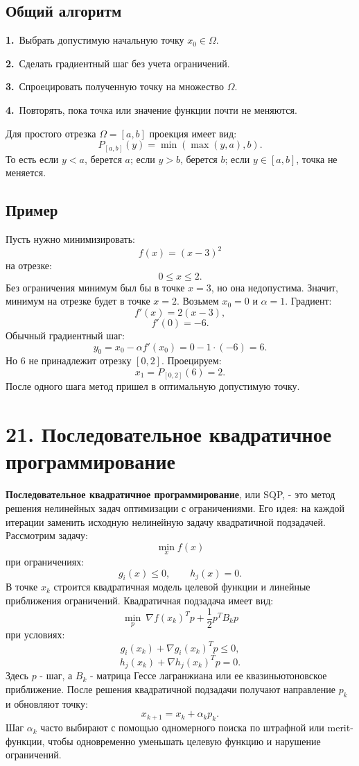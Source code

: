 \documentclass[12pt,a4paper]{article}
\begin{document}
\subsection{Общий алгоритм}
\noindent\textbf{1.}\ Выбрать допустимую начальную точку $x_0\in \Omega$.\par
\noindent\textbf{2.}\ Сделать градиентный шаг без учета ограничений.\par
\noindent\textbf{3.}\ Спроецировать полученную точку на множество $\Omega$.\par
\noindent\textbf{4.}\ Повторять, пока точка или значение функции почти не меняются.\par
Для простого отрезка $\Omega=[a,b]$ проекция имеет вид:
\[
P_{[a,b]}(y)=\min(\max(y,a),b).
\]
То есть если $y<a$, берется $a$; если $y>b$, берется $b$; если $y\in [a,b]$, точка не меняется.
\subsection{Пример}
Пусть нужно минимизировать:
\[
f(x)=(x-3)^2
\]
на отрезке:
\[
0\le x\le 2.
\]
Без ограничения минимум был бы в точке $x=3$, но она недопустима. Значит, минимум на отрезке будет в точке $x=2$.
Возьмем $x_0=0$ и $\alpha=1$. Градиент:
\[
f'(x)=2(x-3),
\]
\[
f'(0)=-6.
\]
Обычный градиентный шаг:
\[
y_0=x_0-\alpha f'(x_0)=0-1\cdot(-6)=6.
\]
Но $6$ не принадлежит отрезку $[0,2]$. Проецируем:
\[
x_1=P_{[0,2]}(6)=2.
\]
После одного шага метод пришел в оптимальную допустимую точку.

\section{21. Последовательное квадратичное программирование}
\textbf{Последовательное квадратичное программирование}, или SQP, - это метод решения нелинейных задач оптимизации с ограничениями. Его идея: на каждой итерации заменить исходную нелинейную задачу квадратичной подзадачей.
Рассмотрим задачу:
\[
\min_x f(x)
\]
при ограничениях:
\[
g_i(x)\le 0,\qquad h_j(x)=0.
\]
В точке $x_k$ строится квадратичная модель целевой функции и линейные приближения ограничений.
Квадратичная подзадача имеет вид:
\[
\min_p\ \nabla f(x_k)^Tp+\frac12p^TB_kp
\]
при условиях:
\[
g_i(x_k)+\nabla g_i(x_k)^Tp\le 0,
\]
\[
h_j(x_k)+\nabla h_j(x_k)^Tp=0.
\]
Здесь $p$ - шаг, а $B_k$ - матрица Гессе лагранжиана или ее квазиньютоновское приближение.
После решения квадратичной подзадачи получают направление $p_k$ и обновляют точку:
\[
x_{k+1}=x_k+\alpha_kp_k.
\]
Шаг $\alpha_k$ часто выбирают с помощью одномерного поиска по штрафной или merit-функции, чтобы одновременно уменьшать целевую функцию и нарушение ограничений.
\end{document}
